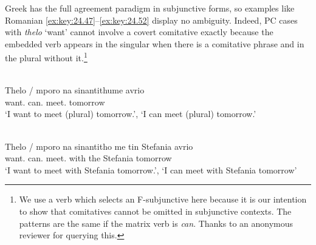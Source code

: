 \documentclass[output=paper]{langsci/langscibook}
\begin{document}
Greek has the full agreement paradigm in subjunctive forms, so examples like
Romanian \eqref{ex:key:24.47}--\eqref{ex:key:24.52} display no ambiguity.
Indeed, \gls{PC} cases with \emph{thelo} ‘want’
cannot involve a covert comitative exactly because the embedded verb appears in
the singular when there is a comitative phrase and in the plural without
it.\footnote{We use a verb which selects an F-subjunctive here because it is
    our intention to show that comitatives cannot be omitted in subjunctive
    contexts. The patterns are the same if the matrix verb is \emph{can}. Thanks to an
anonymous reviewer for querying this.}

\ea%
    \label{ex:key:24.54}\\
	\gll Thelo / mporo    na   sinantithume   avrio\\
        want.\Fsg{} {} can.\Fsg{}  \Sbjv{}   meet.\Fsg{}   tomorrow\\
	\glt ‘I want to meet (plural) tomorrow.’, ‘I can meet (plural) tomorrow.’
\z

\ea%
    \label{ex:key:24.55}\\
	\gll Thelo  / mporo   na   sinantitho   me tin Stefania   avrio\\
    want.\Fsg{} {}  can.\Fsg{} \Sbjv{}  meet.\Fsg{}   with the Stefania   tomorrow\\
	\glt ‘I want to meet with Stefania tomorrow.’, ‘I can meet with Stefania tomorrow’
\z
\end{document}
